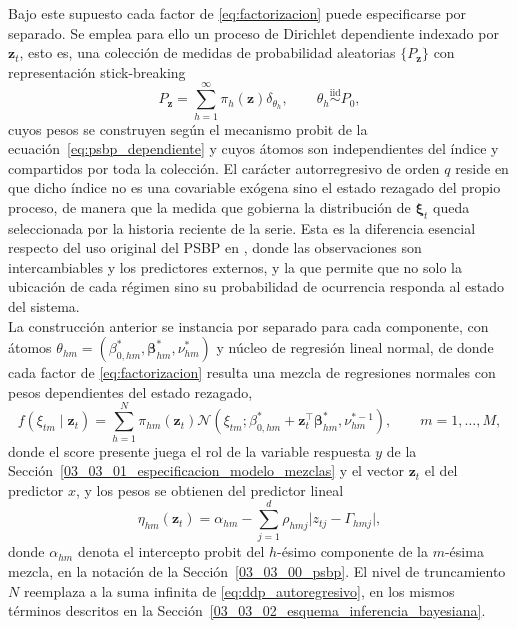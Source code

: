 Bajo este supuesto cada factor de \eqref{eq:factorizacion} puede especificarse por separado. Se emplea para ello un proceso de Dirichlet dependiente indexado por $\mathbf{z}_t$, esto es, una colección de medidas de probabilidad aleatorias $\{P_{\mathbf{z}}\}$ con representación stick-breaking
\begin{equation}\label{eq:ddp_autoregresivo}
    P_{\mathbf{z}} = \sum_{h=1}^{\infty} \pi_h(\mathbf{z})\delta_{\theta_h},
    \qquad \theta_h \overset{\mathrm{iid}}{\sim} P_0,
\end{equation}
cuyos pesos se construyen según el mecanismo probit de la ecuación~\eqref{eq:psbp_dependiente} y cuyos átomos son independientes del índice y compartidos por toda la colección. El carácter autorregresivo de orden $q$ reside en que dicho índice no es una covariable exógena sino el estado rezagado del propio proceso, de manera que la medida que gobierna la distribución de $\boldsymbol{\xi}_t$ queda seleccionada por la historia reciente de la serie. Esta es la diferencia esencial respecto del uso original del PSBP en \citet{03_02_chung2009nonparametric}, donde las observaciones son intercambiables y los predictores externos, y la que permite que no solo la ubicación de cada régimen sino su probabilidad de ocurrencia responda al estado del sistema.\\

La construcción anterior se instancia por separado para cada componente, con átomos $\theta_{hm} = (\beta_{0,hm}^*, \boldsymbol{\beta}_{hm}^*, \nu_{hm}^*)$ y núcleo de regresión lineal normal, de donde cada factor de \eqref{eq:factorizacion} resulta una mezcla de regresiones normales con pesos dependientes del estado rezagado,
\begin{equation}\label{eq:psbpm_fd_componente}
    f(\xi_{tm} \mid \mathbf{z}_{t}) = \sum_{h=1}^{N}
    \pi_{hm}(\mathbf{z}_{t})
    \mathcal{N}\!\left(\xi_{tm};
    \beta_{0,hm}^* + \mathbf{z}_{t}^\top \boldsymbol{\beta}_{hm}^*,
    \nu_{hm}^{*-1}\right),
    \qquad m = 1, \dots, M,
\end{equation}
donde el score presente juega el rol de la variable respuesta $y$ de la Sección~\ref{03_03_01_especificacion_modelo_mezclas} y el vector $\mathbf{z}_t$ el del predictor $x$, y los pesos se obtienen del predictor lineal
\begin{equation}\label{eq:eta_psbpm_fd}
    \eta_{hm}(\mathbf{z}_t) = \alpha_{hm}
    - \sum_{j=1}^{d} \rho_{hmj}\bigl|z_{tj} - \Gamma_{hmj}\bigr|,
\end{equation}
donde $\alpha_{hm}$ denota el intercepto probit del $h$-ésimo componente de la $m$-ésima mezcla, en la notación de la Sección~\ref{03_03_00_psbp}. El nivel de truncamiento $N$ reemplaza a la suma infinita de \eqref{eq:ddp_autoregresivo}, en los mismos términos descritos en la Sección~\ref{03_03_02_esquema_inferencia_bayesiana}.\\

